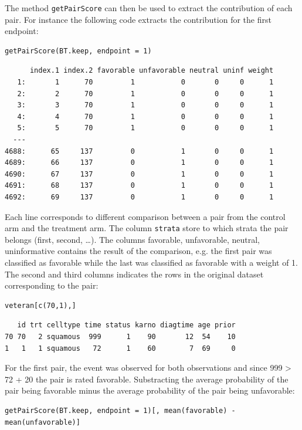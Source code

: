 \documentclass[12pt]{article}
\begin{document}
The method \texttt{getPairScore} can then be used to extract the contribution
of each pair. For instance the following code extracts the
contribution for the first endpoint:
\lstset{language=r,label= ,caption= ,captionpos=b,numbers=none}
\begin{lstlisting}
getPairScore(BT.keep, endpoint = 1)
\end{lstlisting}

\begin{verbatim}
      index.1 index.2 favorable unfavorable neutral uninf weight
   1:       1      70         1           0       0     0      1
   2:       2      70         1           0       0     0      1
   3:       3      70         1           0       0     0      1
   4:       4      70         1           0       0     0      1
   5:       5      70         1           0       0     0      1
  ---                                                           
4688:      65     137         0           1       0     0      1
4689:      66     137         0           1       0     0      1
4690:      67     137         0           1       0     0      1
4691:      68     137         0           1       0     0      1
4692:      69     137         0           1       0     0      1
\end{verbatim}

Each line corresponds to different comparison between a pair from the
control arm and the treatment arm. The column \texttt{strata} store to which
strata the pair belongs (first, second, \ldots{}). The columns favorable,
unfavorable, neutral, uninformative contains the result of the
comparison, e.g. the first pair was classified as favorable while the
last was classified as favorable with a weight of 1. The second and
third columns indicates the rows in the original dataset corresponding
to the pair:
\lstset{language=r,label= ,caption= ,captionpos=b,numbers=none}
\begin{lstlisting}
veteran[c(70,1),]
\end{lstlisting}

\begin{verbatim}
   id trt celltype time status karno diagtime age prior
70 70   2 squamous  999      1    90       12  54    10
1   1   1 squamous   72      1    60        7  69     0
\end{verbatim}



For the first pair, the event was observed for both observations and
since 999 > 72 + 20 the pair is rated favorable. Substracting the
average probability of the pair being favorable minus the average
probability of the pair being unfavorable:
\lstset{language=r,label= ,caption= ,captionpos=b,numbers=none}
\begin{lstlisting}
getPairScore(BT.keep, endpoint = 1)[, mean(favorable) - mean(unfavorable)]
\end{lstlisting}
\end{document}
